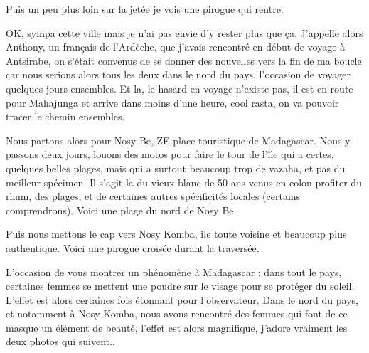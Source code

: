 \begin{multicols}{2}
Puis un peu plus loin sur la jetée je vois une pirogue qui rentre.


OK, sympa cette ville mais je n'ai pas envie d'y rester plus que ça. J'appelle alors Anthony, un français de l'Ardèche, que j'avais rencontré en début de voyage à Antsirabe, on s'était convenus de se donner des nouvelles vers la fin de ma boucle car nous serions alors tous les deux dans le nord du pays, l'occasion de voyager quelques jours ensembles. Et la, le hasard en voyage n'existe pas, il est en route pour Mahajunga et arrive dans moins d'une heure, cool rasta, on va pouvoir tracer le chemin ensembles.

Nous partons alors pour Nosy Be, ZE place touristique de Madagascar. Nous y passons deux jours, louons des motos pour faire le tour de l'île qui a certes, quelques belles plages, mais qui a surtout beaucoup trop de vazaha, et pas du meilleur spécimen. Il s'agit la du vieux blanc de 50 ans venus en colon profiter du rhum, des plages, et de certaines autres spécificités locales (certains comprendrons). Voici une plage du nord de Nosy Be.


Puis nous mettons le cap vers Nosy Komba, ile toute voisine et beaucoup plus authentique. Voici une pirogue croisée durant la traversée.


L'occasion de vous montrer un phénomène à Madagascar : dans tout le pays, certaines femmes se mettent une poudre sur le visage pour se protéger du soleil. L'effet est alors certaines fois étonnant pour l'observateur. Dans le nord du pays, et notamment à Nosy Komba, nous avons rencontré des femmes qui font de ce masque un élément de beauté, l'effet est alors magnifique, j'adore vraiment les deux photos qui suivent..




\end{multicols}
